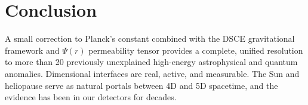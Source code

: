\documentclass[12pt]{article}
\begin{document}
\section*{Conclusion}
A small correction to Planck's constant combined with the DSCE gravitational framework and \( \Psi(r) \) permeability tensor provides a complete, unified resolution to more than 20 previously unexplained high-energy astrophysical and quantum anomalies. Dimensional interfaces are real, active, and measurable. The Sun and heliopause serve as natural portals between 4D and 5D spacetime, and the evidence has been in our detectors for decades.
\end{document}
